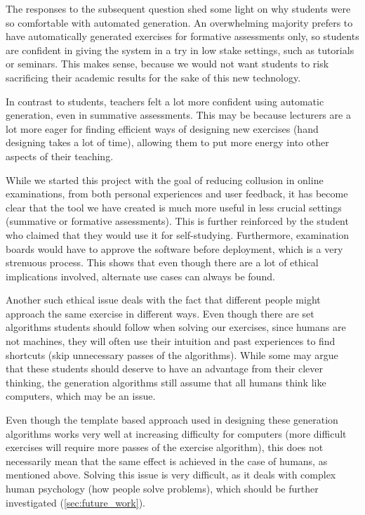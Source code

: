 \documentclass{l4proj}
\begin{document}
The responses to the subsequent question shed some light on why students were so comfortable with automated generation. An overwhelming majority prefers to have automatically generated exercises for formative assessments only, so students are confident in giving the system in a try in low stake settings, such as tutorials or seminars. This makes sense, because we would not want students to risk sacrificing their academic results for the sake of this new technology.

In contrast to students, teachers felt a lot more confident using automatic generation, even in summative assessments. This may be because lecturers are a lot more eager for finding efficient ways of designing new exercises (hand designing takes a lot of time), allowing them to put more energy into other aspects of their teaching.

While we started this project with the goal of reducing collusion in online examinations, from both personal experiences and user feedback, it has become clear that the tool we have created is much more useful in less crucial settings (summative or formative assessments). This is further reinforced by the student who claimed that they would use it for self-studying. Furthermore, examination boards would have to approve the software before deployment, which is a very strenuous process. This shows that even though there are a lot of ethical implications involved, alternate use cases can always be found.

Another such ethical issue deals with the fact that different people might approach the same exercise in different ways. Even though there are set algorithms students should follow when solving our exercises, since humans are not machines, they will often use their intuition and past experiences to find shortcuts (skip unnecessary passes of the algorithms). While some may argue that these students should deserve to have an advantage from their clever thinking, the generation algorithms still assume that all humans think like computers, which may be an issue.

Even though the template based approach used in designing these generation algorithms works very well at increasing difficulty for computers (more difficult exercises will require more passes of the exercise algorithm), this does not necessarily mean that the same effect is achieved in the case of humans, as mentioned above. Solving this issue is very difficult, as it deals with complex human psychology (how people solve problems), which should be further investigated (\autoref{sec:future_work}).
\end{document}
